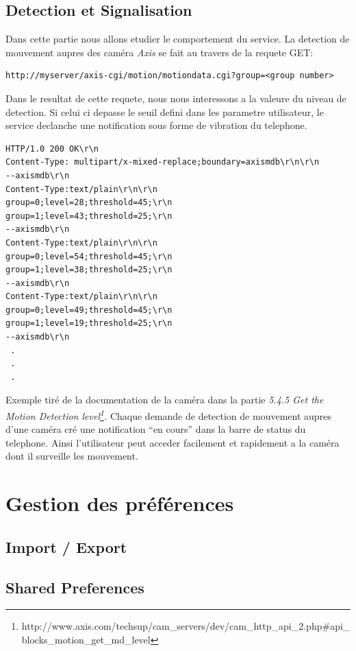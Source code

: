 \subsection{Detection et Signalisation}
Dans cette partie nous allons etudier le comportement du service.
La detection de mouvement aupres des caméra \textit{Axis} se fait au travers de
la requete GET: 
\begin{lstlisting}
http://myserver/axis-cgi/motion/motiondata.cgi?group=<group number>
\end{lstlisting}
Dans le resultat de cette requete, nous nous interessons a la valeure du niveau
de detection. Si celui ci depasse le seuil defini dans les parametre
utilisateur, le service declanche une notification sous forme de vibration du
telephone.\newline
\begin{lstlisting}
HTTP/1.0 200 OK\r\n
Content-Type: multipart/x-mixed-replace;boundary=axismdb\r\n\r\n
--axismdb\r\n
Content-Type:text/plain\r\n\r\n
group=0;level=28;threshold=45;\r\n
group=1;level=43;threshold=25;\r\n
--axismdb\r\n
Content-Type:text/plain\r\n\r\n
group=0;level=54;threshold=45;\r\n
group=1;level=38;threshold=25;\r\n
--axismdb\r\n
Content-Type:text/plain\r\n\r\n
group=0;level=49;threshold=45;\r\n
group=1;level=19;threshold=25;\r\n
--axismdb\r\n
 .
 .
 . 
\end{lstlisting}
Exemple tiré de la documentation de la caméra dans la partie
\textit{5.4.5 Get the Motion Detection
level\footnote{\label{MotionDetectionDoc}
http://www.axis.com/techsup/cam\_servers/dev/cam\_http\_api\_2.php\#api\_blocks\_motion\_get\_md\_level}.}
\newline\indent
Chaque demande de detection de mouvement aupres d'une caméra cré une
notification ``en cours'' dans la barre de status du telephone.
Ainsi l'utilisateur peut acceder facilement et rapidement a la caméra dont il
surveille les mouvement.


\section{Gestion des préférences}
\subsection{Import / Export}

\subsection{Shared Preferences}

